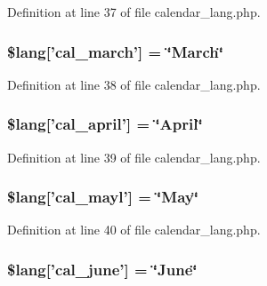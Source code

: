 Definition at line 37 of file calendar\-\_\-lang.\-php.

\hypertarget{calendar__lang_8php_af69ae8067fe6af9913575c2338bdcb00}{
\subsubsection[{\$lang}]{\setlength{\rightskip}{0pt plus 5cm}\$lang\mbox{[}'cal\-\_\-march'\mbox{]} = \char`\"{}March\char`\"{}}}\label{calendar__lang_8php_af69ae8067fe6af9913575c2338bdcb00}


Definition at line 38 of file calendar\-\_\-lang.\-php.

\hypertarget{calendar__lang_8php_a91b47019689ab8d459212335c8bb558f}{
\subsubsection[{\$lang}]{\setlength{\rightskip}{0pt plus 5cm}\$lang\mbox{[}'cal\-\_\-april'\mbox{]} = \char`\"{}April\char`\"{}}}\label{calendar__lang_8php_a91b47019689ab8d459212335c8bb558f}


Definition at line 39 of file calendar\-\_\-lang.\-php.

\hypertarget{calendar__lang_8php_a000c61063bbbaeda4e1e0f81717cf6f2}{
\subsubsection[{\$lang}]{\setlength{\rightskip}{0pt plus 5cm}\$lang\mbox{[}'cal\-\_\-mayl'\mbox{]} = \char`\"{}May\char`\"{}}}\label{calendar__lang_8php_a000c61063bbbaeda4e1e0f81717cf6f2}


Definition at line 40 of file calendar\-\_\-lang.\-php.

\hypertarget{calendar__lang_8php_acf04877cbc6934c38186bfaad8f7c4f0}{
\subsubsection[{\$lang}]{\setlength{\rightskip}{0pt plus 5cm}\$lang\mbox{[}'cal\-\_\-june'\mbox{]} = \char`\"{}June\char`\"{}}}\label{calendar__lang_8php_acf04877cbc6934c38186bfaad8f7c4f0}


